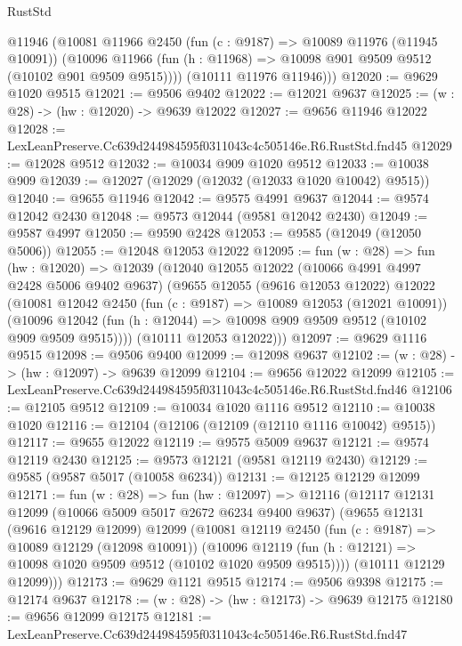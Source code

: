 \begin{lexlean}{RustStd}
\begin{coremodule}
        @11946
        (@10081
          @11966
          @2450
          (fun (c : @9187) => @10089 @11976 (@11945 @10091))
          (@10096 @11966 (fun (h : @11968) => @10098 @901 @9509 @9512 (@10102 @901 @9509 @9515))))
        (@10111 @11976 @11946)))
@12020 := @9629 @1020 @9515
@12021 := @9506 @9402
@12022 := @12021 @9637
@12025 := (w : @28) -> (hw : @12020) -> @9639 @12022
@12027 := @9656 @11946 @12022
@12028 := LexLeanPreserve.Cc639d244984595f0311043c4c505146e.R6.RustStd.fnd45
@12029 := @12028 @9512
@12032 := @10034 @909 @1020 @9512
@12033 := @10038 @909
@12039 := @12027 (@12029 (@12032 (@12033 @1020 @10042) @9515))
@12040 := @9655 @11946
@12042 := @9575 @4991 @9637
@12044 := @9574 @12042 @2430
@12048 := @9573 @12044 (@9581 @12042 @2430)
@12049 := @9587 @4997
@12050 := @9590 @2428
@12053 := @9585 (@12049 (@12050 @5006))
@12055 := @12048 @12053 @12022
@12095 := fun (w : @28) =>
  fun (hw : @12020) =>
  @12039
    (@12040
      @12055
      @12022
      (@10066 @4991 @4997 @2428 @5006 @9402 @9637)
      (@9655
        @12055
        (@9616 @12053 @12022)
        @12022
        (@10081
          @12042
          @2450
          (fun (c : @9187) => @10089 @12053 (@12021 @10091))
          (@10096 @12042 (fun (h : @12044) => @10098 @909 @9509 @9512 (@10102 @909 @9509 @9515))))
        (@10111 @12053 @12022)))
@12097 := @9629 @1116 @9515
@12098 := @9506 @9400
@12099 := @12098 @9637
@12102 := (w : @28) -> (hw : @12097) -> @9639 @12099
@12104 := @9656 @12022 @12099
@12105 := LexLeanPreserve.Cc639d244984595f0311043c4c505146e.R6.RustStd.fnd46
@12106 := @12105 @9512
@12109 := @10034 @1020 @1116 @9512
@12110 := @10038 @1020
@12116 := @12104 (@12106 (@12109 (@12110 @1116 @10042) @9515))
@12117 := @9655 @12022
@12119 := @9575 @5009 @9637
@12121 := @9574 @12119 @2430
@12125 := @9573 @12121 (@9581 @12119 @2430)
@12129 := @9585 (@9587 @5017 (@10058 @6234))
@12131 := @12125 @12129 @12099
@12171 := fun (w : @28) =>
  fun (hw : @12097) =>
  @12116
    (@12117
      @12131
      @12099
      (@10066 @5009 @5017 @2672 @6234 @9400 @9637)
      (@9655
        @12131
        (@9616 @12129 @12099)
        @12099
        (@10081
          @12119
          @2450
          (fun (c : @9187) => @10089 @12129 (@12098 @10091))
          (@10096 @12119 (fun (h : @12121) => @10098 @1020 @9509 @9512 (@10102 @1020 @9509 @9515))))
        (@10111 @12129 @12099)))
@12173 := @9629 @1121 @9515
@12174 := @9506 @9398
@12175 := @12174 @9637
@12178 := (w : @28) -> (hw : @12173) -> @9639 @12175
@12180 := @9656 @12099 @12175
@12181 := LexLeanPreserve.Cc639d244984595f0311043c4c505146e.R6.RustStd.fnd47

\end{coremodule}
\end{lexlean}
